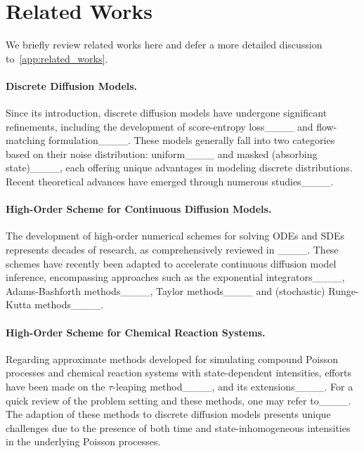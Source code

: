 \section{Related Works}
We briefly review related works here and defer a more detailed discussion to~\cref{app:related_works}.

\vspace{-0.7em}
\paragraph{Discrete Diffusion Models.}
Since its introduction, discrete diffusion models have undergone significant refinements, including the development of score-entropy loss____ and flow-matching formulation____. These models generally fall into two categories based on their noise distribution: uniform____ and masked (absorbing state)____, each offering unique advantages in modeling discrete distributions. Recent theoretical advances have emerged through numerous studies____.

\paragraph{High-Order Scheme for Continuous Diffusion Models.}

The development of high-order numerical schemes for solving ODEs and SDEs represents decades of research, as comprehensively reviewed in ____. These schemes have recently been adapted to accelerate continuous diffusion model inference, encompassing approaches such as the exponential integrators____, Adams-Bashforth methods____, Taylor methods____ and (stochastic) Runge-Kutta methods____.


\paragraph{High-Order Scheme for Chemical Reaction Systems.}

Regarding approximate methods developed for simulating compound Poisson processes and chemical reaction systems with state-dependent intensities, efforts have been made on the $\tau$-leaping method____, and its extensions____. For a quick review of the problem setting and these methods, one may refer to____. The adaption of these methods to discrete diffusion models presents unique challenges due to the presence of both time and state-inhomogeneous intensities in the underlying Poisson processes.